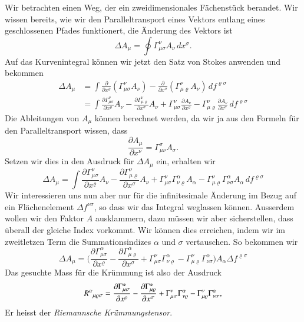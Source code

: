 Wir betrachten einen Weg, der ein zweidimensionales Fächenstück berandet.
Wir wissen bereits, wie wir den Paralleltransport eines Vektors entlang
eines geschlossenen Pfades funktionert, die Änderung des Vektors ist
\[
\Delta A_\mu
= 
\oint \Gamma_{\mu\sigma}^\nu A_\nu\,dx^\sigma.
\]
Auf das Kurvenintegral können wir jetzt den Satz von Stokes anwenden
und bekommen
\begin{align*}
\Delta A_\mu
&=
\int
\frac{\partial}{\partial x^\varrho}
(\Gamma_{\mu\sigma}^\nu A_\nu)
-
\frac{\partial}{\partial x^\sigma}
(\Gamma_{\mu\varrho}^\nu A_\nu)
\,df^{\varrho\sigma}
\\
&=\int
\frac{\partial \Gamma_{\mu\sigma}^\nu}{\partial x^\varrho}A_\nu
-
\frac{\partial \Gamma_{\mu\varrho}^\nu}{\partial x^\sigma}A_\nu
+
\Gamma_{\mu\sigma}^\nu
\frac{\partial A_\nu}{\partial x^\varrho}
-
\Gamma_{\mu\varrho}^\nu
\frac{\partial A_\nu}{\partial x^\sigma}
\,df^{\varrho\sigma}
\end{align*}
Die Ableitungen von $A_\mu$ können berechnet werden, da wir ja aus
den Formeln für den Paralleltransport wissen, dass
\[
\frac{\partial A_\mu}{\partial x^\nu}=\Gamma^{\sigma}_{\mu\nu}A_\sigma.
\]
Setzen wir dies in den Ausdruck für $\Delta A_\mu$ ein, erhalten
wir
\begin{equation}
\Delta A_\mu
=\int
\frac{\partial \Gamma_{\mu\sigma}^\nu}{\partial x^\varrho}A_\nu
-
\frac{\partial \Gamma_{\mu\varrho}^\nu}{\partial x^\sigma}A_\nu
+
\Gamma_{\mu\sigma}^\nu
\Gamma_{\nu\varrho}^\alpha
A_\alpha
-
\Gamma_{\mu\varrho}^\nu
\Gamma_{\nu\sigma}^\alpha
A_\alpha
\,df^{\varrho\sigma}
\end{equation}
Wir interessieren uns nun aber nur für die infinitesimale Änderung
im Bezug auf ein Flächenelement $\Delta f^{\nu\sigma}$, so dass wir
das Integral weglassen können.
Ausserdem wollen wir den Faktor $A$ ausklammern, dazu müssen wir aber
sicherstellen, dass überall der gleiche Index vorkommt.
Wir können dies erreichen, indem wir im zweitletzen Term die
Summationsindizes $\alpha$ und $\sigma$ vertauschen.
So bekommen wir
\[
\Delta A_\mu
=
\biggl(
\frac{\partial \Gamma_{\mu\sigma}^\alpha}{\partial x^\varrho}
-
\frac{\partial \Gamma_{\mu\varrho}^\alpha}{\partial x^\sigma}
+
\Gamma_{\mu\sigma}^\nu
\Gamma_{\nu\varrho}^\alpha
-
\Gamma_{\mu\varrho}^\nu
\Gamma_{\nu\sigma}^\alpha
\biggr)
A_\alpha
\Delta f^{\varrho\sigma}
\]
Das gesuchte Mass für die Krümmung ist also der Ausdruck
\begin{equation}
R^\alpha\mathstrut_{\mu\varrho\sigma}
=
\frac{\partial \Gamma_{\mu\sigma}^\alpha}{\partial x^\varrho}
-
\frac{\partial \Gamma_{\mu\varrho}^\alpha}{\partial x^\sigma}
+
\Gamma_{\mu\sigma}^\nu
\Gamma_{\nu\varrho}^\alpha
-
\Gamma_{\mu\varrho}^\nu
\Gamma_{\nu\sigma}^\alpha,
\label{skript:kruemmung:riemannmixed}
\end{equation}
Er heisst der {\em Riemannsche Krümmungstensor}.

